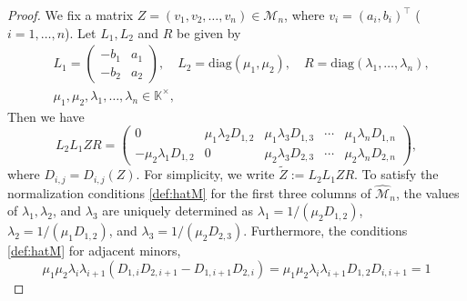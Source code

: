 \documentclass[11pt]{amsart}
\theoremstyle{plain}
\theoremstyle{definition}
\theoremstyle{remark}
\begin{document}
\begin{proof}
We fix a matrix $Z = (v_1, v_2, \dots, v_n) \in \mathcal{M}_n$, where $v_i = (a_i, b_i)^\top$
($i=1,\ldots, n$). Let $L_1, L_2$ and $R$ be given by
\begin{equation}
\begin{aligned}
    &L_1 = \begin{pmatrix} -b_1 & a_1 \\ -b_2 & a_2 \end{pmatrix}, \quad
    L_2 = \mathrm{diag}(\mu_1, \mu_2), \quad
    R = \mathrm{diag}(\lambda_1, \dots, \lambda_n), \\
&\mu_1, \mu_2, \lambda_1, \ldots, \lambda_n \in \mathbb{K}^\times,
\end{aligned}
\end{equation}
Then we have
\begin{equation}
    L_2 L_1 ZR = \begin{pmatrix} 0 & \mu_1 \lambda_2 D_{1,2} & \mu_1 \lambda_3 D_{1,3} & \cdots & \mu_1 \lambda_n D_{1,n} \\ -\mu_2 \lambda_1 D_{1,2} & 0 & \mu_2 \lambda_3 D_{2,3} & \cdots & \mu_2 \lambda_n D_{2,n} \end{pmatrix}, \label{eq:zTilde}
\end{equation}
where $D_{i,j} = D_{i,j}(Z)$.
For simplicity, we write $\widetilde{Z}:=L_2 L_1 ZR$.
To satisfy the normalization conditions \eqref{def:hatM} for the first three
columns of $\widehat{\mathcal{M}}_n$, the values of $\lambda_1, \lambda_2$, and
$\lambda_3$ are uniquely determined as
$\lambda_1 = 1/(\mu_2 D_{1,2})$, $\lambda_2 = 1/(\mu_1 D_{1,2})$, and $\lambda_3 = 1/(\mu_2 D_{2,3})$.
Furthermore, the conditions \eqref{def:hatM} for adjacent minors,
\begin{equation}
\mu_1 \mu_2 \lambda_i \lambda_{i+1} (D_{1,i}D_{2,i+1}-D_{1,i+1}D_{2,i}) = \mu_1 \mu_2 \lambda_i \lambda_{i+1} D_{1,2}D_{i,i+1} = 1

\end{equation}
\end{proof}
\end{document}
